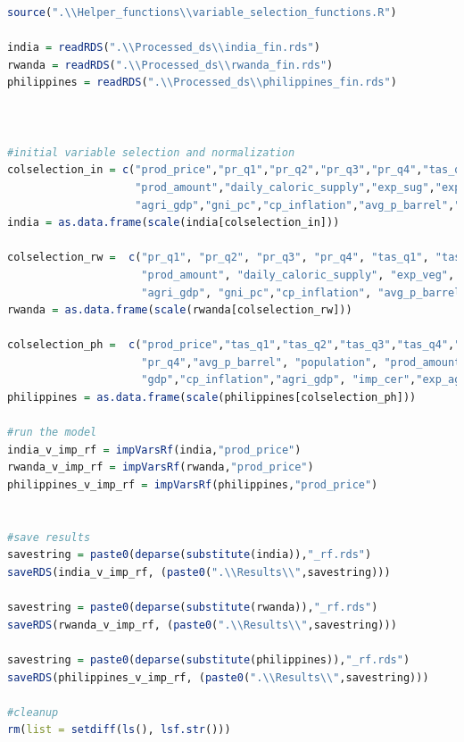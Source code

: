 \documentclass[11pt]{article}
\begin{document}
\begin{lstlisting}[language= R]
source(".\\Helper_functions\\variable_selection_functions.R")

india = readRDS(".\\Processed_ds\\india_fin.rds")
rwanda = readRDS(".\\Processed_ds\\rwanda_fin.rds")
philippines = readRDS(".\\Processed_ds\\philippines_fin.rds")



#initial variable selection and normalization
colselection_in = c("prod_price","pr_q1","pr_q2","pr_q3","pr_q4","tas_q1","tas_q2","tas_q3","tas_q4",
                    "prod_amount","daily_caloric_supply","exp_sug","exp_veg","exp_cer","imp_sug","imp_veg","imp_cer", 
                    "agri_gdp","gni_pc","cp_inflation","avg_p_barrel","population") 
india = as.data.frame(scale(india[colselection_in]))

colselection_rw =  c("pr_q1", "pr_q2", "pr_q3", "pr_q4", "tas_q1", "tas_q2", "tas_q3", "tas_q4",
                     "prod_amount", "daily_caloric_supply", "exp_veg", "exp_cer", "imp_veg", "imp_cer", 
                     "agri_gdp", "gni_pc","cp_inflation", "avg_p_barrel", "population","prod_price")
rwanda = as.data.frame(scale(rwanda[colselection_rw]))

colselection_ph =  c("prod_price","tas_q1","tas_q2","tas_q3","tas_q4","pr_q1","pr_q2","pr_q3",
                     "pr_q4","avg_p_barrel", "population", "prod_amount","gni_pc", "exchange_rate",
                     "gdp","cp_inflation","agri_gdp", "imp_cer","exp_agri","daily_caloric_supply")
philippines = as.data.frame(scale(philippines[colselection_ph]))

#run the model
india_v_imp_rf = impVarsRf(india,"prod_price")
rwanda_v_imp_rf = impVarsRf(rwanda,"prod_price")
philippines_v_imp_rf = impVarsRf(philippines,"prod_price")


#save results
savestring = paste0(deparse(substitute(india)),"_rf.rds")
saveRDS(india_v_imp_rf, (paste0(".\\Results\\",savestring)))

savestring = paste0(deparse(substitute(rwanda)),"_rf.rds")
saveRDS(rwanda_v_imp_rf, (paste0(".\\Results\\",savestring)))

savestring = paste0(deparse(substitute(philippines)),"_rf.rds")
saveRDS(philippines_v_imp_rf, (paste0(".\\Results\\",savestring)))

#cleanup
rm(list = setdiff(ls(), lsf.str()))
\end{lstlisting}
\end{document}
